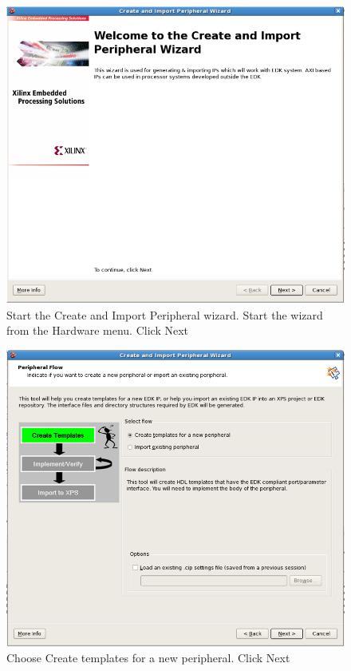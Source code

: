 \documentclass[a4paper,oneside]{memoir}
\begin{document}
\begin{figure}[H]
\centering
\includegraphics[scale=0.5]{step12}
\caption{Start the Create and Import Peripheral wizard. Start the wizard from the Hardware menu. Click Next\label{fig:step12}}
\end{figure}
\begin{figure}[H]
\centering
\includegraphics[scale=0.5]{step13}
\caption{Choose Create templates for a new peripheral. Click Next\label{fig:step13}}
\end{figure} 
\end{document}

